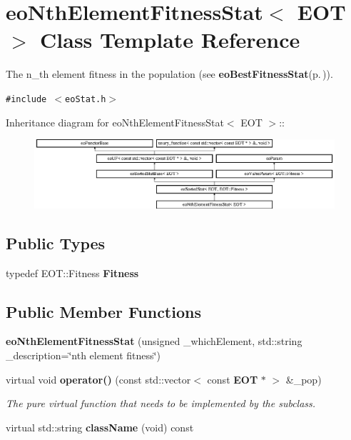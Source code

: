 \section{eo\-Nth\-Element\-Fitness\-Stat$<$ EOT $>$ Class Template Reference}
\label{classeo_nth_element_fitness_stat}
The n\_\-th element fitness in the population (see {\bf eo\-Best\-Fitness\-Stat}{\rm (p.\,\pageref{classeo_best_fitness_stat})}).  


{\tt \#include $<$eo\-Stat.h$>$}

Inheritance diagram for eo\-Nth\-Element\-Fitness\-Stat$<$ EOT $>$::\begin{figure}[H]
\begin{center}
\leavevmode
\includegraphics[height=2.55708cm]{classeo_nth_element_fitness_stat}
\end{center}
\end{figure}
\subsection*{Public Types}
\begin{CompactItemize}
\item 
typedef EOT::Fitness {\bf Fitness}\label{classeo_nth_element_fitness_stat_w0}

\end{CompactItemize}
\subsection*{Public Member Functions}
\begin{CompactItemize}
\item 
{\bf eo\-Nth\-Element\-Fitness\-Stat} (unsigned \_\-which\-Element, std::string \_\-description=\char`\"{}nth element fitness\char`\"{})\label{classeo_nth_element_fitness_stat_a0}

\item 
virtual void {\bf operator()} (const std::vector$<$ const {\bf EOT} $\ast$ $>$ \&\_\-pop)\label{classeo_nth_element_fitness_stat_a1}

\begin{CompactList}\small\item\em The pure virtual function that needs to be implemented by the subclass. \item\end{CompactList}\item 
virtual std::string {\bf class\-Name} (void) const \label{classeo_nth_element_fitness_stat_a2}

\end{CompactItemize}
